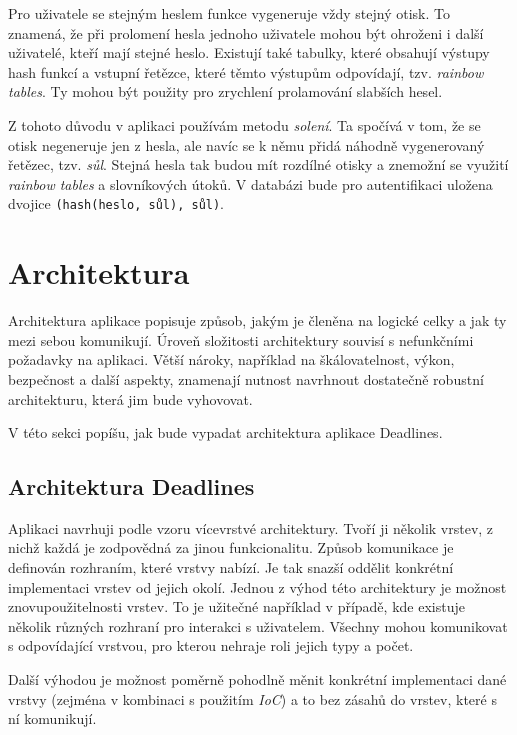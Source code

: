 \documentclass[thesis=B,czech]{FITthesis}[2012/06/26]
\begin{document}
		Pro uživatele se stejným heslem funkce vygeneruje vždy stejný otisk. To znamená, že při prolomení hesla jednoho uživatele mohou být ohroženi i další uživatelé, kteří mají stejné heslo. Existují také tabulky, které obsahují výstupy hash funkcí a vstupní řetězce, které těmto výstupům odpovídají, tzv. \textit{rainbow tables}. \cite{rainbow-table} Ty mohou být použity pro zrychlení prolamování slabších hesel. 
		
		Z tohoto důvodu v aplikaci používám metodu \textit{solení}. Ta spočívá v tom, že se otisk negeneruje jen z hesla, ale navíc se k němu přidá náhodně vygenerovaný řetězec, tzv. \textit{sůl}. Stejná hesla tak budou mít rozdílné otisky a znemožní se využití \textit{rainbow tables} a slovníkových útoků. V databázi bude pro autentifikaci uložena dvojice \texttt{(hash(heslo, sůl), sůl)}. \cite{hash-function}
				
	\section{Architektura}
		Architektura aplikace popisuje způsob, jakým je členěna na logické celky a jak ty mezi sebou komunikují. Úroveň složitosti architektury souvisí s nefunkčními požadavky na aplikaci. Větší nároky, například na škálovatelnost, výkon, bezpečnost a další aspekty, znamenají nutnost navrhnout dostatečně robustní architekturu, která jim bude vyhovovat. 
		
		V této sekci popíšu, jak bude vypadat architektura aplikace Deadlines.
		
	\subsection{Architektura Deadlines}	
		Aplikaci navrhuji podle vzoru vícevrstvé architektury. Tvoří ji několik vrstev, z nichž každá je zodpovědná za jinou funkcionalitu. Způsob komunikace je definován rozhraním, které vrstvy nabízí. Je tak snazší oddělit konkrétní implementaci vrstev od jejich okolí. Jednou z výhod této architektury je možnost znovupoužitelnosti vrstev. To je užitečné například v případě, kde existuje několik různých rozhraní pro interakci s uživatelem. Všechny mohou komunikovat s odpovídající vrstvou, pro kterou nehraje roli jejich typy a počet.
		
		Další výhodou je možnost poměrně pohodlně měnit konkrétní implementaci dané vrstvy (zejména v kombinaci s použitím \textit{IoC}) a to bez zásahů do vrstev, které s ní komunikují. 
		
\end{document}
